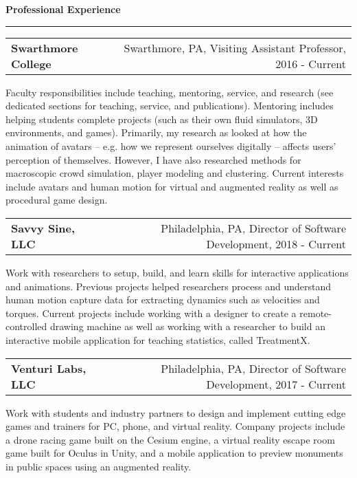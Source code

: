 \needspace{6em}
{\Large {\bf Professional Experience}} 
\vspace{0.1cm}
\hrule
\medskip

\needspace{6em}
\begin{tabular*}{7.1in}{@{}l@{\extracolsep\fill}r}
{\large {\bf Swarthmore College}} & Swarthmore, PA, Visiting Assistant Professor, 2016 - Current\\
\end{tabular*}

Faculty responsibilities include teaching, mentoring, service, and research
(see dedicated sections for teaching, service, and publications).  Mentoring
includes helping students complete projects (such as their own fluid
simulators, 3D environments, and games).  Primarily, my research as looked at
how the animation of avatars -- e.g. how we represent ourselves digitally --
affects users' perception of themselves. However, I have also researched
methods for macroscopic crowd simulation, player modeling and clustering.
Current interests include avatars and human motion for virtual and augmented
reality as well as procedural game design.

\medskip
\medskip

\needspace{6em}
\begin{tabular*}{7.1in}{@{}l@{\extracolsep\fill}r}
{\large {\bf Savvy Sine, LLC}} & Philadelphia, PA, Director of Software Development, 2018 - Current\\
\end{tabular*}

Work with researchers to setup, build, and learn skills for interactive
applications and animations. Previous projects helped researchers process and
understand human motion capture data for extracting dynamics such as velocities
and torques. Current projects include working with a designer to create a
remote-controlled drawing machine as well as working with a researcher to build
an interactive mobile application for teaching statistics, called TreatmentX.  

\medskip
\medskip

\needspace{6em}
\begin{tabular*}{7.1in}{@{}l@{\extracolsep\fill}r}
{\large {\bf Venturi Labs, LLC}} & Philadelphia, PA, Director of Software Development, 2017 - Current\\
\end{tabular*}

Work with students and industry partners to design and implement cutting edge
games and trainers for PC, phone, and virtual reality. Company projects include
a drone racing game built on the Cesium engine, a virtual reality escape room
game built for Oculus in Unity, and a mobile application to preview monuments
in public spaces using an augmented reality.

